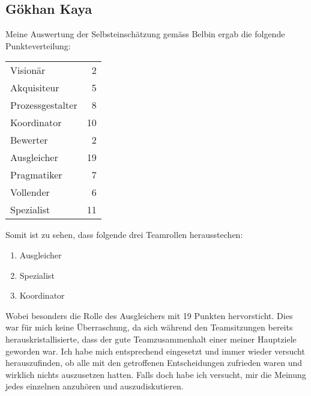 \subsection*{Gökhan Kaya}

Meine Auswertung der Selbsteinschätzung gemäss Belbin ergab die folgende Punkteverteilung:

\begin{tabular}{lr}
  Visionär & 2 \\ 
  Akquisiteur & 5 \\ 
  Prozessgestalter & 8 \\ 
  Koordinator & 10 \\ 
  Bewerter & 2 \\
  Ausgleicher & 19 \\
  Pragmatiker & 7 \\
  Vollender & 6 \\
  Spezialist & 11 \\
\end{tabular}
\newline


Somit ist zu sehen, dass folgende drei Teamrollen herausstechen:
\begin{enumerate} 
\item Ausgleicher 
\item Spezialist
\item Koordinator
\end{enumerate}

Wobei besonders die Rolle des Ausgleichers mit 19 Punkten hervorsticht. Dies war für mich keine Überraschung, da sich während den Teamsitzungen bereits herauskristallisierte, dass der gute Teamzusammenhalt einer meiner Hauptziele geworden war. Ich habe mich entsprechend eingesetzt und immer wieder versucht herauszufinden, ob alle mit den getroffenen Entscheidungen zufrieden waren und wirklich nichts auszusetzen hatten. Falls doch habe ich versucht, mir die Meinung jedes einzelnen anzuhören und auszudiskutieren.

